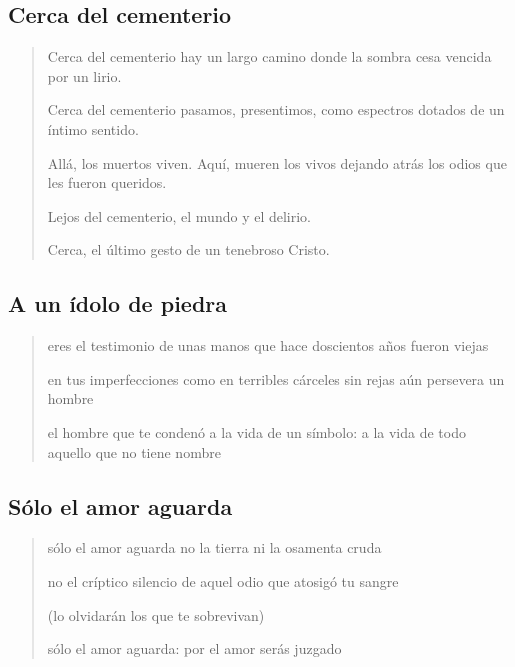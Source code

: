 \documentclass[a4paper, 12pt]{article}
\begin{document}
\pagebreak

\subsection{Cerca del cementerio}
    
\begin{verse}
    Cerca del cementerio
    hay un largo camino
    donde la sombra cesa
    vencida por un lirio.

    Cerca del cementerio
    pasamos, presentimos,
    como espectros dotados
    de un íntimo sentido.

    Allá, los muertos viven.
    Aquí, mueren los vivos
    dejando atrás los odios
    que les fueron queridos.

    Lejos del cementerio,
    el mundo y el delirio.

    Cerca, el último gesto 
    de un tenebroso Cristo.
\end{verse}

\pagebreak

\subsection{A un ídolo de piedra}

\begin{verse}
    
eres el testimonio de unas manos
que hace doscientos años fueron viejas
~

en tus imperfecciones
como en terribles cárceles sin rejas
aún persevera un hombre
~

el hombre que te condenó a la vida
de un símbolo: a la vida
de todo aquello que no tiene nombre
\end{verse}

\pagebreak 

\subsection{Sólo el amor aguarda}

\begin{verse}
sólo el amor aguarda 
no la tierra ni la osamenta cruda
~ 

no el críptico silencio de aquel odio 
que atosigó tu sangre
~ 

(lo olvidarán los que te sobrevivan)
~ 

sólo el amor aguarda:
por el amor serás juzgado


\end{verse}
\end{document}
